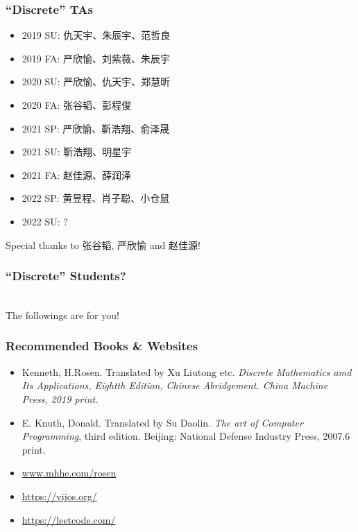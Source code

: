 \documentclass{beamer}
\newcommand{\myfont}{\rmfamily\normalsize\upshape\mdseries}
\begin{document}
\begin{frame}
    \frametitle{``Discrete'' TAs}
  
    \begin{itemize}
        \kaishu
        \item 2019 SU: 仇天宇、朱辰宇、范哲良
        \item 2019 FA: 严欣愉、刘紫薇、朱辰宇 
        \item 2020 SU: 严欣愉、仇天宇、郑慧昕
        \item 2020 FA: 张谷韬、彭程俊
        \item 2021 SP: 严欣愉、靳浩翔、俞泽晟
        \item 2021 SU: 靳浩翔、明星宇
        \item 2021 FA: 赵佳源、薛润泽
        \item 2022 SP: 黄昱程、肖子聪、小仓鼠
        \item 2022 SU: ?
    \end{itemize}
    \vs{0.5em}
    Special thanks to {\kaishu 张谷韬}, {\kaishu 严欣愉} and {\kaishu 赵佳源}!
\end{frame}
\begin{frame}
    \frametitle{``Discrete'' Students?}
    \centering
    \Huge
    \\ \vs{2em}
    The followings are for you!
\end{frame}
\begin{frame}
    \frametitle{Recommended Books \& Websites}
    \begin{itemize}
        \item Kenneth, H.Rosen. Translated by Xu Liutong etc. \itshape Discrete Mathematics amd Its Applications\myfont, 
        Eightth Edition, Chinese Abridgement. China Machine Press, 2019 print.
        \item E. Knuth, Donald. Translated by Su Daolin. \textit{The art of Computer Programming}, third edition.
        Beijing: National Defense Industry Press, 2007.6 print.
        \item \url{www.mhhe.com/rosen}
        \item \url{https://vijos.org/}
        \item \url{https://leetcode.com/}
    \end{itemize}

\end{frame}
\end{document}
